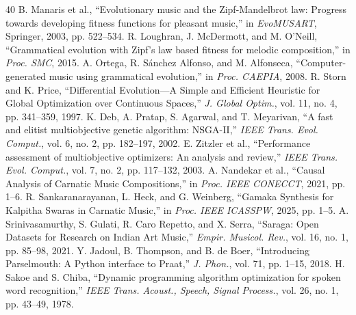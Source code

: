 \documentclass[12pt,a4paper]{report}
\begin{document}
\begin{thebibliography}{40}
 B. Manaris et al., ``Evolutionary music and the Zipf-Mandelbrot law: Progress towards developing fitness functions for pleasant music,'' in \emph{EvoMUSART}, Springer, 2003, pp. 522--534.
 R. Loughran, J. McDermott, and M. O'Neill, ``Grammatical evolution with Zipf's law based fitness for melodic composition,'' in \emph{Proc. SMC}, 2015.
 A. Ortega, R. S{\'a}nchez Alfonso, and M. Alfonseca, ``Computer-generated music using grammatical evolution,'' in \emph{Proc. CAEPIA}, 2008.
 R. Storn and K. Price, ``Differential Evolution---A Simple and Efficient Heuristic for Global Optimization over Continuous Spaces,'' \emph{J. Global Optim.}, vol. 11, no. 4, pp. 341--359, 1997.
 K. Deb, A. Pratap, S. Agarwal, and T. Meyarivan, ``A fast and elitist multiobjective genetic algorithm: NSGA-II,'' \emph{IEEE Trans. Evol. Comput.}, vol. 6, no. 2, pp. 182--197, 2002.
 E. Zitzler et al., ``Performance assessment of multiobjective optimizers: An analysis and review,'' \emph{IEEE Trans. Evol. Comput.}, vol. 7, no. 2, pp. 117--132, 2003.
 A. Nandekar et al., ``Causal Analysis of Carnatic Music Compositions,'' in \emph{Proc. IEEE CONECCT}, 2021, pp. 1--6.
 R. Sankaranarayanan, L. Heck, and G. Weinberg, ``Gamaka Synthesis for Kalpitha Swaras in Carnatic Music,'' in \emph{Proc. IEEE ICASSPW}, 2025, pp. 1--5.
 A. Srinivasamurthy, S. Gulati, R. Caro Repetto, and X. Serra, ``Saraga: Open Datasets for Research on Indian Art Music,'' \emph{Empir. Musicol. Rev.}, vol. 16, no. 1, pp. 85--98, 2021.
 Y. Jadoul, B. Thompson, and B. de Boer, ``Introducing Parselmouth: A Python interface to Praat,'' \emph{J. Phon.}, vol. 71, pp. 1--15, 2018.
 H. Sakoe and S. Chiba, ``Dynamic programming algorithm optimization for spoken word recognition,'' \emph{IEEE Trans. Acoust., Speech, Signal Process.}, vol. 26, no. 1, pp. 43--49, 1978.
\end{thebibliography}
\end{document}
